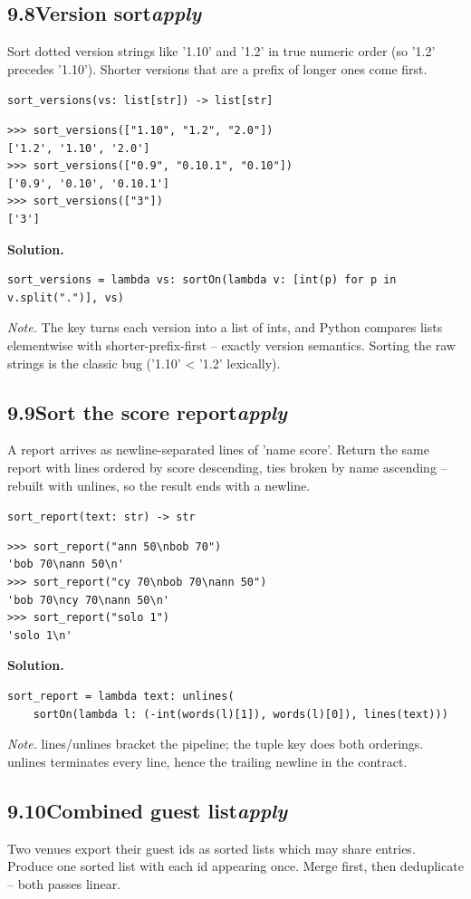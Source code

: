 \documentclass[10pt,letterpaper]{book}
\begin{document}
\subsection*{9.8\quad Version sort\hfill\textnormal{\textit{apply}}}
Sort dotted version strings like '1.10' and '1.2' in true numeric order (so '1.2' precedes '1.10'). Shorter versions that are a prefix of longer ones come first.

\noindent\texttt{sort\_versions(vs: list[str]) -> list[str]}
\begin{lstlisting}[style=ex]
>>> sort_versions(["1.10", "1.2", "2.0"])
['1.2', '1.10', '2.0']
>>> sort_versions(["0.9", "0.10.1", "0.10"])
['0.9', '0.10', '0.10.1']
>>> sort_versions(["3"])
['3']
\end{lstlisting}
\noindent\textbf{Solution.}
\begin{lstlisting}[style=code]
sort_versions = lambda vs: sortOn(lambda v: [int(p) for p in v.split(".")], vs)
\end{lstlisting}
\noindent\textit{Note.} The key turns each version into a list of ints, and Python compares lists elementwise with shorter-prefix-first -- exactly version semantics. Sorting the raw strings is the classic bug ('1.10' < '1.2' lexically).

\subsection*{9.9\quad Sort the score report\hfill\textnormal{\textit{apply}}}
A report arrives as newline-separated lines of 'name score'. Return the same report with lines ordered by score descending, ties broken by name ascending -- rebuilt with unlines, so the result ends with a newline.

\noindent\texttt{sort\_report(text: str) -> str}
\begin{lstlisting}[style=ex]
>>> sort_report("ann 50\nbob 70")
'bob 70\nann 50\n'
>>> sort_report("cy 70\nbob 70\nann 50")
'bob 70\ncy 70\nann 50\n'
>>> sort_report("solo 1")
'solo 1\n'
\end{lstlisting}
\noindent\textbf{Solution.}
\begin{lstlisting}[style=code]
sort_report = lambda text: unlines(
    sortOn(lambda l: (-int(words(l)[1]), words(l)[0]), lines(text)))
\end{lstlisting}
\noindent\textit{Note.} lines/unlines bracket the pipeline; the tuple key does both orderings. unlines terminates every line, hence the trailing newline in the contract.

\subsection*{9.10\quad Combined guest list\hfill\textnormal{\textit{apply}}}
Two venues export their guest ids as sorted lists which may share entries. Produce one sorted list with each id appearing once. Merge first, then deduplicate -- both passes linear.
\end{document}

